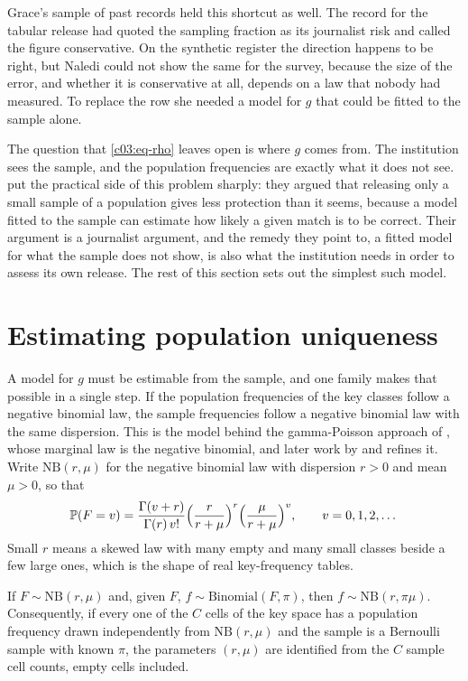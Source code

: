 Grace's sample of past records held this shortcut as well. The record for the tabular release had quoted the sampling fraction as its journalist risk and called the figure conservative. On the synthetic register the direction happens to be right, but Naledi could not show the same for the survey, because the size of the error, and whether it is conservative at all, depends on a law that nobody had measured. To replace the row she needed a model for $g$ that could be fitted to the sample alone.

The question that \eqref{c03:eq-rho} leaves open is where $g$ comes from. The
institution sees the sample, and the population frequencies are exactly what it does
not see. \citet{rocher2019} put the practical side of this problem sharply: they argued
that releasing only a small sample of a population gives less protection than it seems,
because a model fitted to the sample can estimate how likely a given match is to be
correct. Their argument is a journalist argument, and the remedy they point to, a fitted
model for what the sample does not show, is also what the institution needs in order to
assess its own release. The rest of this section sets out the simplest such model.

\section{Estimating population uniqueness}

A model for $g$ must be estimable from the sample, and one family makes that possible in
a single step. If the population frequencies of the key classes follow a negative
binomial law, the sample frequencies follow a negative binomial law with the same
dispersion. This is the model behind the gamma-Poisson approach of
\citet{bethlehem1990}, whose marginal law is the negative binomial, and later work by
\citet{rinott2006} and \citet{shlomoskinner2010} refines it. Write
$\mathrm{NB}(r,\mu)$ for the negative binomial law with dispersion $r > 0$ and mean
$\mu > 0$, so that
\begin{equation}\label{c03:eq-nb}
\mathbb{P}(F = v) = \frac{\Gamma(v+r)}{\Gamma(r)\,v!}\Big(\frac{r}{r+\mu}\Big)^{r}
\Big(\frac{\mu}{r+\mu}\Big)^{v}, \qquad v = 0, 1, 2, \dots
\end{equation}
Small $r$ means a skewed law with many empty and many small classes beside a few large
ones, which is the shape of real key-frequency tables.

\begin{proposition}\label{c03:prop-thin}
If $F \sim \mathrm{NB}(r,\mu)$ and, given $F$, $f \sim \mathrm{Binomial}(F,\pi)$, then
$f \sim \mathrm{NB}(r,\pi\mu)$. Consequently, if every one of the $C$ cells of the key
space has a population frequency drawn independently from $\mathrm{NB}(r,\mu)$ and the
sample is a Bernoulli sample with known $\pi$, the parameters $(r,\mu)$ are identified
from the $C$ sample cell counts, empty cells included.
\end{proposition}

